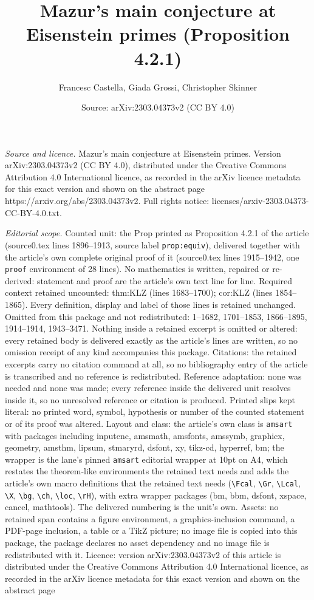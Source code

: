 \documentclass[10pt,a4paper]{amsart}
\title[Mazur's main conjecture at Eisenstein primes]{Mazur's main conjecture at Eisenstein primes (Proposition 4.2.1)}
\author{Francesc Castella, Giada Grossi, Christopher Skinner}
\date{Source: arXiv:2303.04373v2 (CC BY 4.0)}
\begin{document}
\maketitle

\noindent\emph{Source and licence.} Mazur's main conjecture at Eisenstein primes. Version arXiv:2303.04373v2 (CC BY 4.0), distributed under the Creative Commons Attribution 4.0 International licence, as recorded in the arXiv licence metadata for this exact version and shown on the abstract page https://arxiv.org/abs/2303.04373v2. Full rights notice: licenses/arxiv-2303.04373-CC-BY-4.0.txt.\par\smallskip

\noindent\textit{Editorial scope.} Counted unit: the Prop printed as Proposition 4.2.1 of the article (source0.tex lines 1896--1913, source label \texttt{prop:equiv}), delivered together with the article's own complete original proof of it (source0.tex lines 1915--1942, one \texttt{proof} environment of 28 lines). No mathematics is written, repaired or re-derived: statement and proof are the article's own text line for line. Required context retained uncounted: thm:KLZ (lines 1683--1700); cor:KLZ (lines 1854--1865). Every definition, display and label of those lines is retained unchanged. Omitted from this package and not redistributed: 1--1682, 1701--1853, 1866--1895, 1914--1914, 1943--3471. Nothing inside a retained excerpt is omitted or altered: every retained body is delivered exactly as the article's lines are written, so no omission receipt of any kind accompanies this package. Citations: the retained excerpts carry no citation command at all, so no bibliography entry of the article is transcribed and no reference is redistributed. Reference adaptation: none was needed and none was made; every reference inside the delivered unit resolves inside it, so no unresolved reference or citation is produced. Printed slips kept literal: no printed word, symbol, hypothesis or number of the counted statement or of its proof was altered. Layout and class: the article's own class is \texttt{amsart} with packages including inputenc, amsmath, amsfonts, amssymb, graphicx, geometry, amsthm, lipsum, stmaryrd, dsfont, xy, tikz-cd, hyperref, bm; the wrapper is the lane's pinned \texttt{amsart} editorial wrapper at 10pt on A4, which restates the theorem-like environments the retained text needs and adds the article's own macro definitions that the retained text needs (\texttt{\textbackslash Fcal}, \texttt{\textbackslash Gr}, \texttt{\textbackslash Lcal}, \texttt{\textbackslash X}, \texttt{\textbackslash bg}, \texttt{\textbackslash ch}, \texttt{\textbackslash loc}, \texttt{\textbackslash rH}), with extra wrapper packages (bm, bbm, dsfont, xspace, cancel, mathtools). The delivered numbering is the unit's own. Assets: no retained span contains a figure environment, a graphics-inclusion command, a PDF-page inclusion, a table or a TikZ picture; no image file is copied into this package, the package declares no asset dependency and no image file is redistributed with it. Licence: version arXiv:2303.04373v2 of this article is distributed under the Creative Commons Attribution 4.0 International licence, as recorded in the arXiv licence metadata for this exact version and shown on the abstract page 
\end{document}
